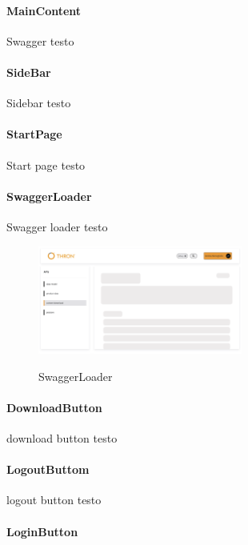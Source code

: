 \paragraph{MainContent}\label{par:main-content}
Swagger testo

\paragraph{SideBar}\label{par:side-bar}

Sidebar testo

\paragraph{StartPage}\label{par:start-page}

Start page testo

\paragraph{SwaggerLoader}\label{par:swagger-loader}

Swagger loader testo
\begin{figure}[ht]
  \centering
  \includegraphics[width=0.6\textwidth, alt={Skeleton loader di caricamento per contenuto principale}]{images/frontend/SwaggerLoader.jpg}
  \caption{SwaggerLoader}\label{fig:swagger-loader}
\end{figure}

\paragraph{DownloadButton}\label{par:download-button}

download button testo

\paragraph{LogoutButtom}\label{par:logout-button}

logout button testo

\paragraph{LoginButton}\label{par:login-button}

